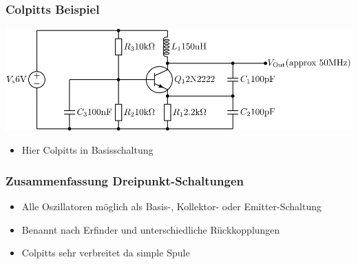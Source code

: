 \begin{frame}
    \frametitle{Colpitts Beispiel}
        \begin{center}
        \includegraphics[width=1\textwidth,height=.6\textheight,keepaspectratio]{a07/NPN_Colpitts_oscillator_collector_coil.png} \\[1em]
     	\begin{itemize}
			\item Hier Colpitts in Basisschaltung
    	\end{itemize}
    \end{center}
\end{frame}

\begin{frame}
    \frametitle{Zusammenfassung Dreipunkt-Schaltungen}
         \begin{itemize}
			\item Alle Oszillatoren möglich als Basis-, Kollektor- oder Emitter-Schaltung
			\item Benannt nach Erfinder und unterschiedliche Rückkopplungen
			\item Colpitts sehr verbreitet da simple Spule
    	\end{itemize}
\end{frame}

